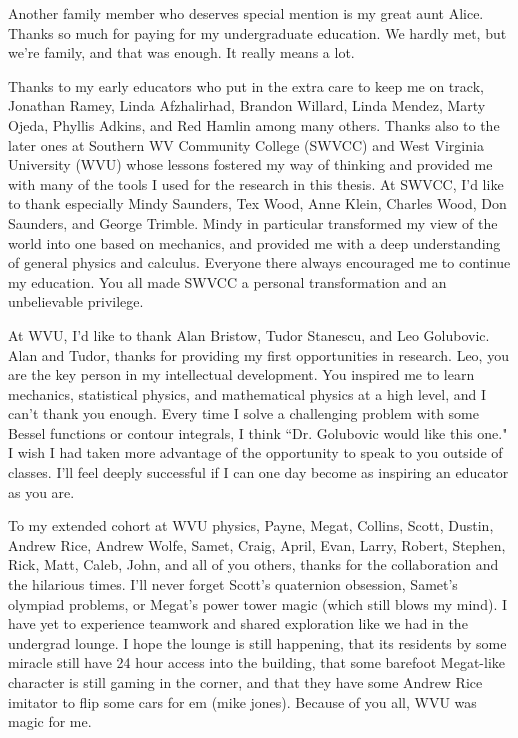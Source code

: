 Another family member who deserves special mention is my great aunt Alice. Thanks so much for paying for my undergraduate education. We hardly met, but we're family, and that was enough. It really means a lot.

Thanks to my early educators who put in the extra care to keep me on track, Jonathan Ramey, Linda Afzhalirhad, Brandon Willard, Linda Mendez, Marty Ojeda, Phyllis Adkins, and Red Hamlin among many others.
Thanks also to the later ones at Southern WV Community College (SWVCC) and West Virginia University (WVU) whose lessons fostered my way of thinking and provided me with many of the tools I used for the research in this thesis. At SWVCC, I'd like to thank especially Mindy Saunders, Tex Wood, Anne Klein, Charles Wood, Don Saunders, and George Trimble. Mindy in particular transformed my view of the world into one based on mechanics, and provided me with a deep understanding of general physics and calculus. Everyone there always encouraged me to continue my education. You all made SWVCC a personal transformation and an unbelievable privilege.

At WVU, I'd like to thank Alan Bristow, Tudor Stanescu, and Leo Golubovic. Alan and Tudor, thanks for providing my first opportunities in research. Leo, you are the key person in my intellectual development. You inspired me to learn mechanics, statistical physics, and mathematical physics at a high level, and I can't thank you enough. Every time I solve a challenging problem with some Bessel functions or contour integrals, I think ``Dr. Golubovic would like this one." I wish I had taken more advantage of the opportunity to speak to you outside of classes. I'll feel deeply successful if I can one day become as inspiring an educator as you are.

To my extended cohort at WVU physics, Payne, Megat, Collins, Scott, Dustin, Andrew Rice, Andrew Wolfe, Samet, Craig, April, Evan, Larry, Robert, Stephen, Rick, Matt, Caleb, John, and all of you others, thanks for the collaboration and the hilarious times. I'll never forget Scott's quaternion obsession, Samet's olympiad problems, or Megat's power tower magic (which still blows my mind). I have yet to experience teamwork and shared exploration like we had in the undergrad lounge. I hope the lounge is still happening, that its residents by some miracle still have 24 hour access into the building, that some barefoot Megat-like character is still gaming in the corner, and that they have some Andrew Rice imitator to flip some cars for em (mike jones). Because of you all, WVU was magic for me.

